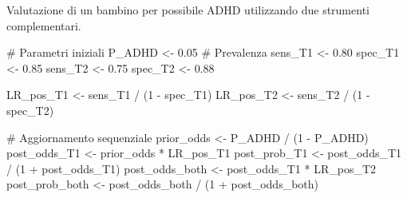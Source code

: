 \documentclass[
  italian,
  letterpaper,
  a4paper,
  11pt,
  open=any]{scrbook}
\newenvironment{Shaded}{\begin{snugshade}}{\end{snugshade}}
\newcommand{\CommentTok}[1]{\textcolor[rgb]{0.37,0.37,0.37}{#1}}
\newcommand{\DecValTok}[1]{\textcolor[rgb]{0.68,0.00,0.00}{#1}}
\newcommand{\FloatTok}[1]{\textcolor[rgb]{0.68,0.00,0.00}{#1}}
\newcommand{\NormalTok}[1]{\textcolor[rgb]{0.00,0.23,0.31}{#1}}
\newcommand{\OtherTok}[1]{\textcolor[rgb]{0.00,0.23,0.31}{#1}}
\newcommand{\SpecialCharTok}[1]{\textcolor[rgb]{0.37,0.37,0.37}{#1}}
\theoremstyle{plain}
\theoremstyle{definition}
\theoremstyle{definition}
\theoremstyle{remark}
\begin{document}
\begin{tcolorbox}[enhanced jigsaw, arc=.35mm, bottomrule=.15mm, bottomtitle=1mm, breakable, colback=white, colbacktitle=quarto-callout-note-color!10!white, colframe=quarto-callout-note-color-frame, coltitle=black, left=2mm, leftrule=.75mm, opacityback=0, opacitybacktitle=0.6, rightrule=.15mm, title=\textcolor{quarto-callout-note-color}{\faInfo}\hspace{0.5em}{Esempio: diagnostica sequenziale nell'ADHD}, titlerule=0mm, toprule=.15mm, toptitle=1mm]

Valutazione di un bambino per possibile ADHD utilizzando due strumenti
complementari.

\begin{Shaded}
\begin{Highlighting}[]
\CommentTok{\# Parametri iniziali}
\NormalTok{P\_ADHD }\OtherTok{\textless{}{-}} \FloatTok{0.05}       \CommentTok{\# Prevalenza}
\NormalTok{sens\_T1 }\OtherTok{\textless{}{-}} \FloatTok{0.80}
\NormalTok{spec\_T1 }\OtherTok{\textless{}{-}} \FloatTok{0.85}
\NormalTok{sens\_T2 }\OtherTok{\textless{}{-}} \FloatTok{0.75}
\NormalTok{spec\_T2 }\OtherTok{\textless{}{-}} \FloatTok{0.88}

\NormalTok{LR\_pos\_T1 }\OtherTok{\textless{}{-}}\NormalTok{ sens\_T1 }\SpecialCharTok{/}\NormalTok{ (}\DecValTok{1} \SpecialCharTok{{-}}\NormalTok{ spec\_T1)}
\NormalTok{LR\_pos\_T2 }\OtherTok{\textless{}{-}}\NormalTok{ sens\_T2 }\SpecialCharTok{/}\NormalTok{ (}\DecValTok{1} \SpecialCharTok{{-}}\NormalTok{ spec\_T2)}

\CommentTok{\# Aggiornamento sequenziale}
\NormalTok{prior\_odds }\OtherTok{\textless{}{-}}\NormalTok{ P\_ADHD }\SpecialCharTok{/}\NormalTok{ (}\DecValTok{1} \SpecialCharTok{{-}}\NormalTok{ P\_ADHD)}
\NormalTok{post\_odds\_T1 }\OtherTok{\textless{}{-}}\NormalTok{ prior\_odds }\SpecialCharTok{*}\NormalTok{ LR\_pos\_T1}
\NormalTok{post\_prob\_T1 }\OtherTok{\textless{}{-}}\NormalTok{ post\_odds\_T1 }\SpecialCharTok{/}\NormalTok{ (}\DecValTok{1} \SpecialCharTok{+}\NormalTok{ post\_odds\_T1)}
\NormalTok{post\_odds\_both }\OtherTok{\textless{}{-}}\NormalTok{ post\_odds\_T1 }\SpecialCharTok{*}\NormalTok{ LR\_pos\_T2}
\NormalTok{post\_prob\_both }\OtherTok{\textless{}{-}}\NormalTok{ post\_odds\_both }\SpecialCharTok{/}\NormalTok{ (}\DecValTok{1} \SpecialCharTok{+}\NormalTok{ post\_odds\_both)}


\end{Highlighting}
\end{Shaded}
\end{tcolorbox}
\end{document}

